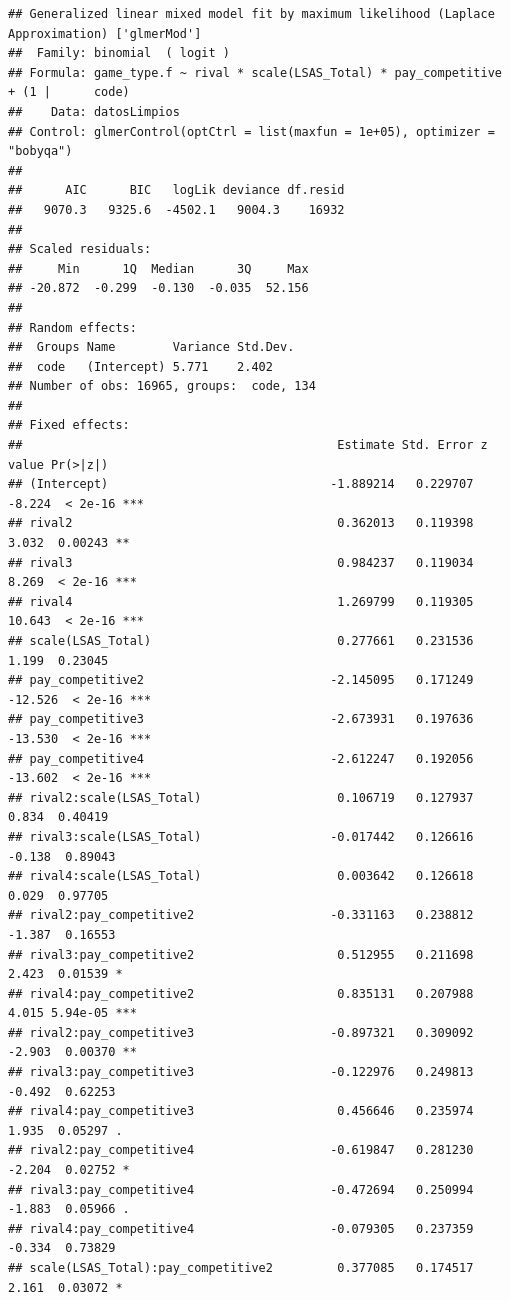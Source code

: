 \documentclass[
]{article}
\begin{document}
\begin{verbatim}
## Generalized linear mixed model fit by maximum likelihood (Laplace Approximation) ['glmerMod']
##  Family: binomial  ( logit )
## Formula: game_type.f ~ rival * scale(LSAS_Total) * pay_competitive + (1 |      code)
##    Data: datosLimpios
## Control: glmerControl(optCtrl = list(maxfun = 1e+05), optimizer = "bobyqa")
## 
##      AIC      BIC   logLik deviance df.resid 
##   9070.3   9325.6  -4502.1   9004.3    16932 
## 
## Scaled residuals: 
##     Min      1Q  Median      3Q     Max 
## -20.872  -0.299  -0.130  -0.035  52.156 
## 
## Random effects:
##  Groups Name        Variance Std.Dev.
##  code   (Intercept) 5.771    2.402   
## Number of obs: 16965, groups:  code, 134
## 
## Fixed effects:
##                                            Estimate Std. Error z value Pr(>|z|)    
## (Intercept)                               -1.889214   0.229707  -8.224  < 2e-16 ***
## rival2                                     0.362013   0.119398   3.032  0.00243 ** 
## rival3                                     0.984237   0.119034   8.269  < 2e-16 ***
## rival4                                     1.269799   0.119305  10.643  < 2e-16 ***
## scale(LSAS_Total)                          0.277661   0.231536   1.199  0.23045    
## pay_competitive2                          -2.145095   0.171249 -12.526  < 2e-16 ***
## pay_competitive3                          -2.673931   0.197636 -13.530  < 2e-16 ***
## pay_competitive4                          -2.612247   0.192056 -13.602  < 2e-16 ***
## rival2:scale(LSAS_Total)                   0.106719   0.127937   0.834  0.40419    
## rival3:scale(LSAS_Total)                  -0.017442   0.126616  -0.138  0.89043    
## rival4:scale(LSAS_Total)                   0.003642   0.126618   0.029  0.97705    
## rival2:pay_competitive2                   -0.331163   0.238812  -1.387  0.16553    
## rival3:pay_competitive2                    0.512955   0.211698   2.423  0.01539 *  
## rival4:pay_competitive2                    0.835131   0.207988   4.015 5.94e-05 ***
## rival2:pay_competitive3                   -0.897321   0.309092  -2.903  0.00370 ** 
## rival3:pay_competitive3                   -0.122976   0.249813  -0.492  0.62253    
## rival4:pay_competitive3                    0.456646   0.235974   1.935  0.05297 .  
## rival2:pay_competitive4                   -0.619847   0.281230  -2.204  0.02752 *  
## rival3:pay_competitive4                   -0.472694   0.250994  -1.883  0.05966 .  
## rival4:pay_competitive4                   -0.079305   0.237359  -0.334  0.73829    
## scale(LSAS_Total):pay_competitive2         0.377085   0.174517   2.161  0.03072 *  

\end{verbatim}
\end{document}
